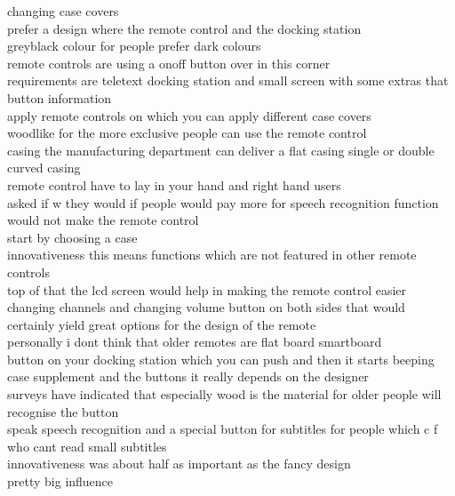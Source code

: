 \documentclass[11pt,a4paper]{article}
\begin{document}
\begin{mdframed}[style=theoremstyle, frametitle={Our System (KeyRank) (250 words)}]
changing case covers
\\ prefer a design where the remote control and the docking station
\\ greyblack colour for people prefer dark colours
\\ remote controls are using a onoff button over in this corner
\\ requirements are teletext docking station and small screen with some extras that button information
\\ apply remote controls on which you can apply different case covers
\\ woodlike for the more exclusive people can use the remote control
\\ casing the manufacturing department can deliver a flat casing single or double curved casing
\\ remote control have to lay in your hand and right hand users
\\ asked if w they would if people would pay more for speech recognition function would not make the remote control
\\ start by choosing a case
\\ innovativeness this means functions which are not featured in other remote controls
\\ top of that the lcd screen would help in making the remote control easier
\\ changing channels and changing volume button on both sides that would certainly yield great options for the design of the remote
\\ personally i dont think that older remotes are flat board smartboard
\\ button on your docking station which you can push and then it starts beeping
\\ case supplement and the buttons it really depends on the designer
\\ surveys have indicated that especially wood is the material for older people will recognise the button
\\ speak speech recognition and a special button for subtitles for people which c f who cant read small subtitles
\\ innovativeness was about half as important as the fancy design
\\ pretty big influence
\end{mdframed}
\end{document}
